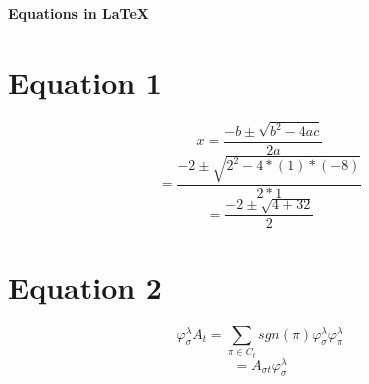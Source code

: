 \documentclass[10pt,a4paper]{article}
\begin{document}
 
\begin{center} 
\Large{\textbf{Equations in \LaTeX}}  
\end{center}  
\section*{Equation 1}  
\begin{fleqn}  
\[ 
x = \frac{-b \pm \sqrt{b^{2}-4ac}}{2a}  
\] 
\[ = 
\frac{-2 \pm \sqrt{2^{2}-4*(1)*(-8)}}{2*1} 
\] 
\[  
= \frac{-2 \pm \sqrt{4+32}}{2} 
\] 
\end{fleqn} 
\section*{Equation 2} 
\begin{fleqn} 
\[ 
\varphi^{\lambda}_{\sigma}A_{t} =\sum_{\pi \in C_{t}} 
sgn(\pi)\varphi^{\lambda}_{\sigma}\varphi^{\lambda}_{\pi} 
\]  
\[ 
=A_{\sigma t} \varphi^{\lambda}_{\sigma} 
\]  
\end{fleqn}  
\end{document}
